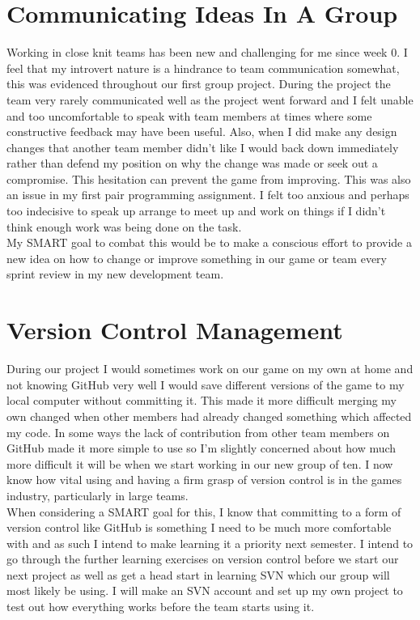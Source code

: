 \documentclass{scrartcl}
\begin{document}
\section{Communicating Ideas In A Group}

Working in close knit teams has been new and challenging for me since week 0. I feel that my introvert nature is a hindrance to team communication somewhat, this was evidenced throughout our first group project. During the project the team very rarely communicated well as the project went forward and I felt unable and too uncomfortable to speak with team members at times where some constructive feedback may have been useful. Also, when I did make any design changes that another team member didn't like I would back down immediately rather than defend my position on why the change was made or seek out a compromise. This hesitation can prevent the game from improving. This was also an issue in my first pair programming assignment. I felt too anxious and perhaps too indecisive to speak up arrange to meet up and work on things if I didn't think enough work was being done on the task. 
\\
My SMART goal to combat this would be to make a conscious effort to provide a new idea on how to change or improve something in our game or team every sprint review in my new development team.


\section{Version Control Management}

During our project I would sometimes work on our game on my own at home and not knowing GitHub very well I would save different versions of the game to my local computer without committing it. This made it more difficult merging my own changed when other members had already changed something which affected my code. In some ways the lack of contribution from other team members on GitHub made it more simple to use so I'm slightly concerned about how much more difficult it will be when we start working in our new group of ten. 
I now know how vital using and having a firm grasp of version control is in the games industry, particularly in large teams. 
\\
When considering a SMART goal for this, I know that committing to a form of version control like GitHub is something I need to be much more comfortable with and as such I intend to make learning it a priority next semester. I intend to go through the further learning exercises on version control before we start our next project as well as get a head start in learning SVN which our group will most likely be using. I will make an SVN account and set up my own project to test out how everything works before the team starts using it.
\end{document}
